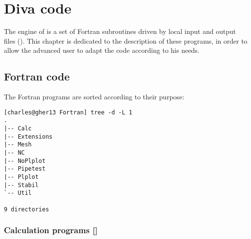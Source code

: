 \chapter[Diva code]{Diva code}
\hypertarget{DIVACODE}{}

The engine of \diva is a set of Fortran subroutines driven by local input and output files ().
This chapter is dedicated to the description of these programs, in order to allow the advanced user to adapt the code according to his needs.

\minitoc


\section[Fortran code]{Fortran code \expert}

The Fortran programs are sorted according to their purpose: 

\begin{lstlisting}[style=Bash]
[charles@gher13 Fortran] tree -d -L 1
.
|-- Calc
|-- Extensions
|-- Mesh
|-- NC
|-- NoPlplot
|-- Pipetest
|-- Plplot
|-- Stabil
`-- Util

9 directories
\end{lstlisting}

\subsection[Calculation programs]{Calculation programs []}

